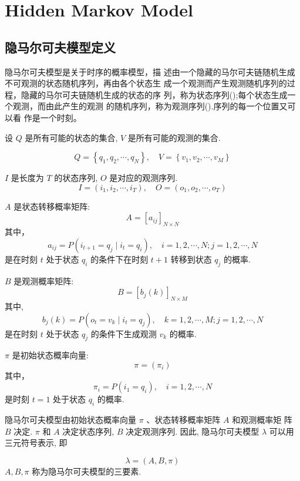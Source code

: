 \chapter{Hidden Markov Model}

\section{隐马尔可夫模型定义}

隐马尔可夫模型是关于时序的概率模型，描
述由一个隐藏的马尔可夫链随机生成不可观测的状态随机序列，再由各个状态生
成一个观测而产生观测随机序列的过程，隐藏的马尔可夫链随机生成的状态的序
列，称为状态序列();每个状态生成一个观测，而由此产生的观测
的随机序列，称为观测序列().序列的每一个位置又可以看
作是一个时刻。

\begin{definition}[隐马尔可夫模型]
    设 $ Q $ 是所有可能的状态的集合, $ V $ 是所有可能的观测的集合.

$$
Q=\left\{q_{1}, q_{2}, \cdots, q_{N}\right\}, \quad V=\left\{v_{1}, v_{2}, \cdots, v_{M}\right\}
$$

$ I $ 是长度为 $ T $ 的状态序列, $ O $ 是对应的观测序列.
$$
I=\left(i_{1}, i_{2}, \cdots, i_{T}\right), \quad O=\left(o_{1}, o_{2}, \cdots, o_{T}\right)
$$

$ A $ 是状态转移概率矩阵:
$$
A=\left[a_{i j}\right]_{N \times N}
$$
其中，
$$
a_{i j}=P\left(i_{t+1}=q_{j} \mid i_{t}=q_{i}\right), \quad i=1,2, \cdots, N ; j=1,2, \cdots, N
$$
是在时刻 $ t $ 处于状态 $ q_{i} $ 的条件下在时刻 $ t+1 $ 转移到状态 $ q_{j} $ 的概率.

$ B $ 是观测概率矩阵:
$$
B=\left[b_{j}(k)\right]_{N \times M}
$$
其中,
$$
b_{j}(k)=P\left(o_{t}=v_{k} \mid i_{t}=q_{j}\right), \quad k=1,2, \cdots, M ; j=1,2, \cdots, N
$$
是在时刻 $ t $ 处于状态 $ q_{j} $ 的条件下生成观测 $ v_{k} $ 的概率.

$ \pi $ 是初始状态概率向量:
$$
\pi=\left(\pi_{i}\right)
$$
其中，
$$
\pi_{i}=P\left(i_{1}=q_{i}\right), \quad i=1,2, \cdots, N
$$
是时刻 $ t=1 $ 处于状态 $ q_{i} $ 的概率.

\end{definition}

隐马尔可夫模型由初始状态概率向量 $ \pi $ 、状态转移概率矩阵 $ A $ 和观测概率矩 阵 $ B $ 决定. $ \pi $ 和 $ A $ 决定状态序列, $ B $ 决定观测序列. 因此, 隐马尔可夫模型 $ \lambda $ 可以用三元符号表示, 即

$$
\lambda=(A, B, \pi)
$$
$ A, B, \pi $ 称为隐马尔可夫模型的三要素.

